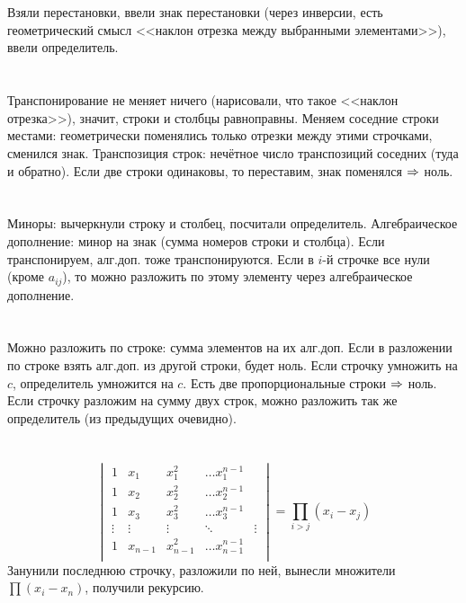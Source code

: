 \section{} %
Взяли перестановки, ввели знак перестановки (через инверсии, есть геометрический смысл <<наклон отрезка между выбранными элементами>>), ввели определитель.

\section{} %
Транспонирование не меняет ничего (нарисовали, что такое <<наклон отрезка>>), значит, строки и столбцы равноправны.
Меняем соседние строки местами: геометрически поменялись только отрезки между этими строчками, сменился знак.
Транспозиция строк: нечётное число транспозиций соседних (туда и обратно).
Если две строки одинаковы, то переставим, знак поменялся $\Rightarrow$ ноль.

\section{} %
Миноры: вычеркнули строку и столбец, посчитали определитель.
Алгебраическое дополнение: минор на знак (сумма номеров строки и столбца).
Если транспонируем, алг.доп. тоже транспонируются.
Если в $i$-й строчке все нули (кроме $a_{ij}$), то можно разложить по этому элементу через алгебраическое дополнение.

\section{} %
Можно разложить по строке: сумма элементов на их алг.доп.
Если в разложении по строке взять алг.доп. из другой строки, будет ноль.
Если строчку умножить на $c$, определитель умножится на $c$.
Есть две пропорциональные строки $\Rightarrow$ ноль.
Если строчку разложим на сумму двух строк, можно разложить так же определитель (из предыдущих очевидно).

\section{} %
\[
\begin{vmatrix}
1 & x_1 & x_1^2 & \dots x_1^{n-1} \\
1 & x_2 & x_2^2 & \dots x_2^{n-1} \\
1 & x_3 & x_3^2 & \dots x_3^{n-1} \\
\vdots & \vdots & \vdots & \ddots & \vdots \\
1 & x_{n-1} & x_{n-1}^2 & \dots x_{n-1}^{n-1} \\
\end{vmatrix}
=\prod_{i > j} (x_i - x_j)
\]
Занунили последнюю строчку, разложили по ней, вынесли множители $\prod (x_i - x_n)$, получили рекурсию.

